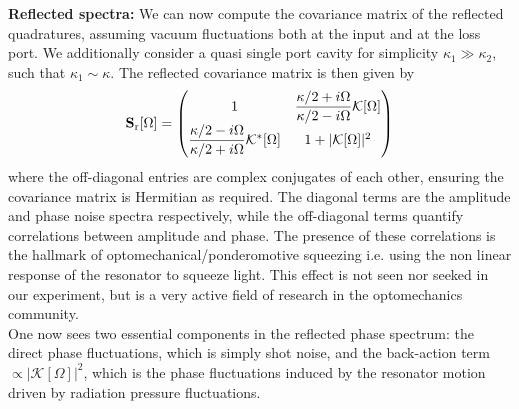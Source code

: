 \noindent \textbf{Reflected spectra:} We can now compute the covariance matrix of the reflected quadratures, assuming vacuum fluctuations both at the input and at the loss port. We additionally consider a quasi single port cavity for simplicity $\kappa_1 \gg \kappa_2$, such that $\kappa_1\sim\kappa$. The reflected covariance matrix is then given by
\begin{equation}
      \mathbf{S}_{\rm r}[\Omega] =\begin{pmatrix}
        1 & \dfrac{\kappa/2 + i\Omega}{\kappa/2 - i\Omega} \mathcal{K}[\Omega]\\[6pt]
         \dfrac{\kappa/2 - i\Omega}{\kappa/2 + i\Omega} \mathcal{K}^{*}[\Omega]& 1 +  |\mathcal{K}[\Omega]|^2
      \end{pmatrix}
\end{equation}
where the off-diagonal entries are complex conjugates of each other, ensuring the covariance matrix is Hermitian as required. The diagonal terms are the amplitude and phase noise spectra respectively, while the off-diagonal terms quantify correlations between amplitude and phase. The presence of these correlations is the hallmark of optomechanical/ponderomotive squeezing i.e. using the non linear response of the resonator to squeeze light. This effect is not seen nor seeked in our experiment, but is a very active field of research in the optomechanics community. \\

One now sees two essential components in the reflected phase spectrum: the direct phase fluctuations, which is simply shot noise, and the back-action term $\propto |\mathcal{K}[\Omega]|^2$, which is the phase fluctuations induced by the resonator motion driven by radiation pressure fluctuations. 
